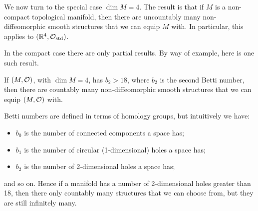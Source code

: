 We now turn to the special case $\dim M = 4$. The result is that if $M$ is a non-compact topological manifold, then there are uncountably many non-diffeomorphic smooth structures that we can equip $M$ with. In particular, this applies to $(\mathbb{R}^4,\mathcal{O}_\mathrm{std})$.

In the compact case there are only partial results. By way of example, here is one such result.

\bp
If $(M,\mathcal{O})$, with $\dim M = 4$, has $b_2>18$, where $b_2$ is the second Betti number, then there are countably many non-diffeomorphic smooth structures that we can equip $(M,\mathcal{O})$ with. 
\ep

Betti numbers are defined in terms of homology groups, but intuitively we have:
\begin{itemize}
\item $b_0$ is the number of connected components a space has;
\item $b_1$ is the number of circular (1-dimensional) holes a space has;
\item $b_2$ is the number of 2-dimensional holes a space has;
\end{itemize}
and so on. Hence if a manifold has a number of 2-dimensional holes greater than 18, then there only countably many structures that we can choose from, but they are still infinitely many.











